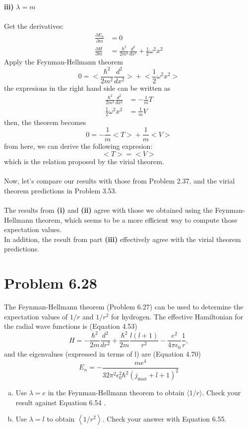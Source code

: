 \documentclass[12 pt]{article}
\numberwithin{equation}{section}
\begin{document}
\\
\\
\textbf{iii)} $\lambda= m$\\
\\
Get the derivatives:
\begin{align*}
  \frac{\partial E_n}{\partial m} &= 0\\
  \frac{\partial H}{\partial m} &= \frac{\hbar^2}{2m^2}\frac{d^2}{dx^2} + \frac{1}{2}\omega^2x^2
\end{align*}
Apply the Feynman-Hellmann theorem
\[
  0 = \bigg<\frac{\hbar^2}{2m^2}\frac{d^2}{dx^2}\bigg> +
  \bigg<\frac{1}{2}\omega^2x^2 \bigg>
\]
the expresions in the right hand side can be written as 
\begin{align*}
  \frac{\hbar^2}{2m^2}\frac{d^2}{dx^2} &= -\frac{1}{m}T\\
  \frac{1}{2}\omega^2x^2 &= \frac{1}{m}V
\end{align*}
then, the theorem becomes 
\[
 0 = -\frac{1}{m}\bigg<T\bigg> + \frac{1}{m}\bigg<V\bigg>
\]
from here, we can derive the following expresion: 
\[
  \boxed{ \bigg<T\bigg> = \bigg<V\bigg>}
\]
which is the relation proposed by the virial theorem.\\
\\
Now, let's compare our results with those from Problem 2.37, and the virial theorem predictions 
in Problem 3.53. \\
\\
The results from \textbf{(i)} and \textbf{(ii)} agree with those we obtained using the Feynman-
Hellmann theorem, which seems to be a more efficient way to compute those expectation values. 
\\
In addition, the result from part \textbf{(iii)} effectively agree with the virial theorem 
predictions. 
\section*{Problem 6.28}
The Feynman-Hellmann theorem (Problem 6.27) can be used to determine the expectation values of 
$1 / r$ and $1 / r^2$ for hydrogen.  The effective Hamiltonian for the radial wave functions
is (Equation 4.53)
\[
H=-\frac{\hbar^2}{2 m} \frac{d^2}{d r^2}+\frac{\hbar^2}{2 m} \frac{l(l+1)}{r^2}-
\frac{e^2}{4 \pi \epsilon_0} \frac{1}{r},
\]
and the eigenvalues (expressed in terms of l) are (Equation 4.70)
\[
E_n=-\frac{m e^4}{32 \pi^2 \epsilon_0^2 \hbar^2\left(j_{\max }+l+1\right)^2}
\]
\begin{enumerate}[a)]
  \item Use $\lambda=e$ in the Feynman-Hellmann theorem to obtain $\langle 1 / r\rangle$. 
    Check your result against Equation 6.54 .
  \item  Use $\lambda=l$ to obtain $\left\langle 1 / r^2\right\rangle$. Check your answer 
    with Equation 6.55.
\end{enumerate}
\end{document}
